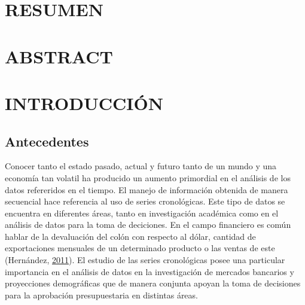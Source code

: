 \documentclass[
]{article}
\begin{document}
\cleardoublepage

\tableofcontents
\listoftables
\listoffigures

\cleardoublepage
{}

\newpage

\section*{RESUMEN}

\cleardoublepage

\section*{ABSTRACT}

\cleardoublepage

\section{INTRODUCCIÓN}

\subsection{Antecedentes}

Conocer tanto el estado pasado, actual y futuro tanto de un mundo y una
economía tan volatil ha producido un aumento primordial en el análisis
de los datos refereridos en el tiempo. El manejo de información obtenida
de manera secuencial hace referencia al uso de series cronológicas. Este
tipo de datos se encuentra en diferentes áreas, tanto en investigación
académica como en el análisis de datos para la toma de deciciones. En el
campo financiero es común hablar de la devaluación del colón con
respecto al dólar, cantidad de exportaciones mensuales de un determinado
producto o las ventas de este (Hernández,
\protect\hyperlink{ref-oscarh-1}{2011}). El estudio de las series
cronológicas posee una particular importancia en el análisis de datos en
la investigación de mercados bancarios y proyecciones demográficas que
de manera conjunta apoyan la toma de decisiones para la aprobación
presupuestaria en distintas áreas.
\end{document}

